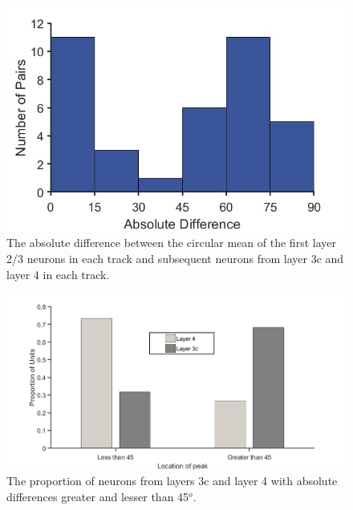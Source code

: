 	\begin{figure}[H]
	
	\includegraphics[width=\linewidth]{ShrewV1/cmdiff.jpg}
	\caption{The absolute difference between the circular mean of the first layer 2/3 neurons in each track and subsequent neurons from layer 3c and layer 4 in each track.}
	\label{fig:cmdiff}
	\end{figure}

	\begin{figure}[H]
		
		\includegraphics[width=\linewidth]{ShrewV1/cmlayer.jpg}
		\caption{The proportion of neurons from layers 3c and layer 4 with absolute differences greater and lesser than 45$^o$.}
		\label{fig:cmlayer}
	\end{figure}
	
